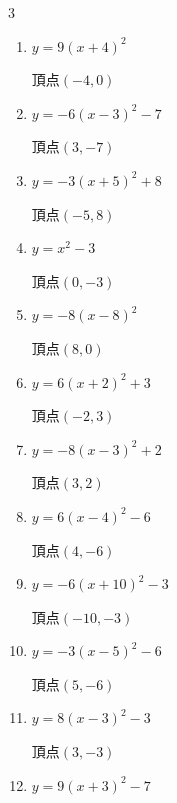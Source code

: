 \begin{multicols}{3}
\begin{enumerate}
        $\displaystyle 頂点\left( 4 , 8 \right)$

  \item $\displaystyle y=9\left( x+4\right)^{2}$

        $\displaystyle 頂点\left( -4 , 0 \right)$

  \item $\displaystyle y=-6\left( x-3\right)^{2}-7$

        $\displaystyle 頂点\left( 3 , -7 \right)$

  \item $\displaystyle y=-3\left( x+5\right)^{2}+8$

        $\displaystyle 頂点\left( -5 , 8 \right)$

  \item $\displaystyle y=x^{2}-3$

        $\displaystyle 頂点\left( 0 , -3 \right)$

  \item $\displaystyle y=-8\left( x-8\right)^{2}$

        $\displaystyle 頂点\left( 8 , 0 \right)$

  \item $\displaystyle y=6\left( x+2\right)^{2}+3$

        $\displaystyle 頂点\left( -2 , 3 \right)$

  \item $\displaystyle y=-8\left( x-3\right)^{2}+2$

        $\displaystyle 頂点\left( 3 , 2 \right)$

  \item $\displaystyle y=6\left( x-4\right)^{2}-6$

        $\displaystyle 頂点\left( 4 , -6 \right)$

  \item $\displaystyle y=-6\left( x+10\right)^{2}-3$

        $\displaystyle 頂点\left( -10 , -3 \right)$

  \item $\displaystyle y=-3\left( x-5\right)^{2}-6$

        $\displaystyle 頂点\left( 5 , -6 \right)$

\columnbreak %

  \item $\displaystyle y=8\left( x-3\right)^{2}-3$

        $\displaystyle 頂点\left( 3 , -3 \right)$

  \item $\displaystyle y=9\left( x+3\right)^{2}-7$


\end{enumerate}
\end{multicols}
